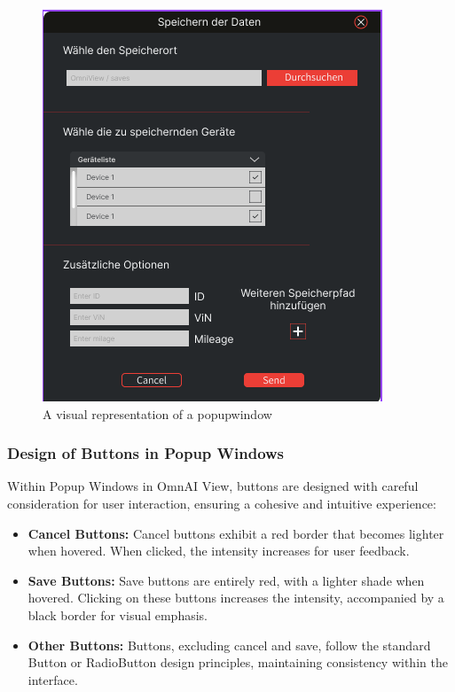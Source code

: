 \documentclass[]{scrreprt}
\begin{document}
\begin{figure}
    \includegraphics[width=.9\textwidth]{assets/pictures/Popupwindow_png.png}
    \caption[]{A visual representation of a popupwindow}
    \label{fig:popupwindow}
    \end{figure}


\subsubsection{Design of Buttons in Popup Windows}\label{cap:Designprinciples_PopupButtons}

Within Popup Windows in OmnAI View, buttons are designed with careful consideration for user interaction, ensuring a cohesive and intuitive experience:

\begin{itemize}
    \item \textbf{Cancel Buttons:} Cancel buttons exhibit a red border that becomes lighter when hovered. When clicked, the intensity increases for user feedback.
    
    \item \textbf{Save Buttons:} Save buttons are entirely red, with a lighter shade when hovered. Clicking on these buttons increases the intensity, accompanied by a black border for visual emphasis.
    
    \item \textbf{Other Buttons:} Buttons, excluding cancel and save, follow the standard Button or RadioButton design principles, maintaining consistency within the interface.
\end{itemize}
\end{document}
